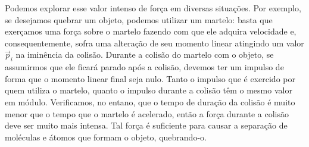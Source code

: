 Podemos explorar esse valor intenso de força em diversas situações. Por exemplo, se desejamos quebrar um objeto, podemos utilizar um martelo: basta que exerçamos uma força sobre o martelo fazendo com que ele adquira velocidade e, consequentemente, sofra uma alteração de seu momento linear atingindo um valor $\vec{p}_i$ na iminência da colisão. Durante a colisão do martelo com o objeto, se assumirmos que ele ficará parado após a colisão, devemos ter um impulso de forma que o momento linear final seja nulo. Tanto o impulso que é exercido por quem utiliza o martelo, quanto o impulso durante a colisão têm o mesmo valor em módulo. Verificamos, no entano, que o tempo de duração da colisão é muito menor que o tempo que o martelo é acelerado, então a força durante a colisão deve ser muito mais intensa. Tal força é suficiente para causar a separação de moléculas e átomos que formam o objeto, quebrando-o.

